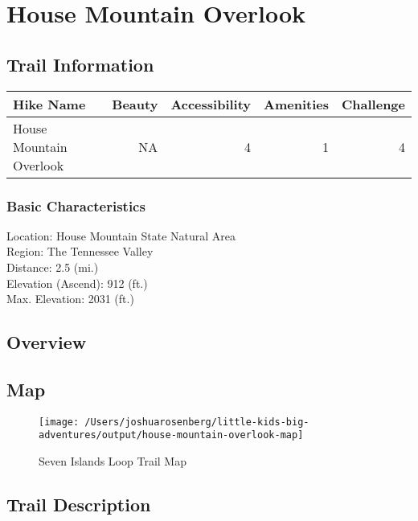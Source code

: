 \documentclass[
]{book}
\begin{document}
\hypertarget{house-mountain-overlook}{%
\chapter{House Mountain Overlook}\label{house-mountain-overlook}}

\hypertarget{trail-information-5}{%
\section{Trail Information}\label{trail-information-5}}

\begin{tabular}{l|r|r|r|r}
\hline
Hike Name & Beauty & Accessibility & Amenities & Challenge\\
\hline
House Mountain Overlook & NA & 4 & 1 & 4\\
\hline
\end{tabular}

\hypertarget{basic-characteristics-5}{%
\subsection{Basic Characteristics}\label{basic-characteristics-5}}

Location: House Mountain State Natural Area\\
Region: The Tennessee Valley\\
Distance: 2.5 (mi.)\\
Elevation (Ascend): 912 (ft.)\\
Max. Elevation: 2031 (ft.)

\hypertarget{overview-5}{%
\section{Overview}\label{overview-5}}

\hypertarget{map-5}{%
\section{Map}\label{map-5}}

\begin{figure}
\texttt{[image: /Users/joshuarosenberg/little-kids-big-adventures/output/house-mountain-overlook-map]} \caption{Seven Islands Loop Trail Map}\label{fig:unnamed-chunk-19}
\end{figure}

\hypertarget{trail-description-5}{%
\section{Trail Description}\label{trail-description-5}}
\end{document}
